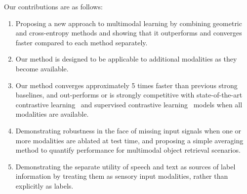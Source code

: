 \documentclass[10pt]{article} %
\newcommand{\todokdinline}[1]{\todo[color=red!20,inline]{{KD: \small #1}}}
\newcommand{\todoff}[1]{\todo[color=blue!20]{\small #1 -- Frank}}
\newcommand{\todoffinline}[1]{\todo[inline,color=blue!20]{\small #1 -- Frank}}
\begin{document}
Our contributions are as follows:
\begin{enumerate}
    \item Proposing a new approach to multimodal learning by combining geometric and cross-entropy methods and showing that it outperforms and converges faster compared to each method separately.
    
    \item Our method is designed to be applicable to additional modalities as they become available.

    \item Our method converges approximately 5 times faster than previous strong baselines, and out-performs or is strongly competitive with state-of-the-art contrastive learning~\citep{chen2020simple} and supervised contrastive learning~\citep{NEURIPS2020_supervised_contrastive} models when all modalities are available.

    \item Demonstrating robustness in the face of missing input signals when one or more modalities are ablated at test time, and proposing a simple averaging method to quantify performance for multimodal object retrieval scenarios.
    
    \item Demonstrating the separate utility of speech and text as sources of label information by treating them as sensory input modalities, rather than explicitly as labels.
    
    
\end{enumerate}

\end{document}
